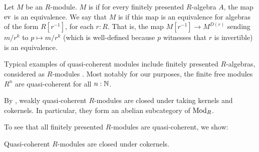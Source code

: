 \begin{definition}\label{def:quasi-coherent}
  Let $M$ be an $R$-module.
  $M$ is  if for every finitely presented $R$-algebra $A$, the map $\mathrm{ev}$ is an equivalence.
  We say that $M$ is  if this map is an equivalence for algebras of the form $R[r^{-1}]$, for each $r : R$.
  That is, the map $M[r^{-1}] \to M^{D(r)}$ sending $m/r^k$ to $p \mapsto m/r^k$
  (which is well-defined because $p$ witnesses that $r$ is invertible)
  is an equivalence.
\end{definition}

Typical examples of quasi-coherent modules include finitely presented $R$-algebras, considered as $R$-modules \cite[Lemma 3.3.1]{draft}.
Most notably for our purposes, the finite free modules $R^n$ are quasi-coherent for all $n : \mathbb{N}$.

\begin{remark}\label{rem:wqc-abelian}
  By \cite[Lemma 7.1.6 and Proposition 7.1.13]{draft}, weakly quasi-coherent $R$-modules are closed under taking kernels and cokernels.
  In particular, they form an abelian subcategory of $\textup{Mod}_{R}$.
\end{remark}

To see that all finitely presented $R$-modules are quasi-coherent, we show:

\begin{lemma}\label{lem:qc-colimits}
  Quasi-coherent $R$-modules are closed under cokernels.
\end{lemma}

